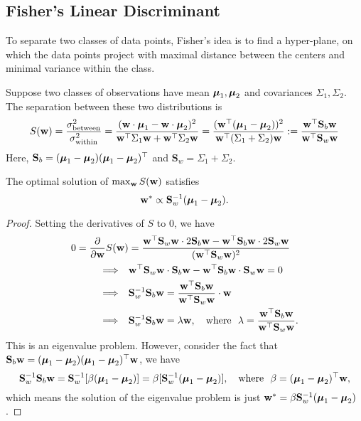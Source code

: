 \subsection{Fisher's Linear Discriminant}
To separate two classes of data points, Fisher's idea is to find a hyper-plane, on which the data points project with  maximal distance between the centers and minimal variance within the class.
\begin{definition}[Separation]
	Suppose two classes of observations have mean $\boldsymbol{\mu}_1, \boldsymbol{\mu}_2$ and covariances $\Sigma_1, \Sigma_2$. The separation between these two distributions is
	$$
	S(\mathbf{w}) =\frac {\sigma_{\text{between}}^{2}}{\sigma _{\text{within}}^{2}}={\frac {({ {\mathbf{w}}}\cdot { {\boldsymbol{\mu}}}_{1}-{ {\mathbf{w}}}\cdot { {\boldsymbol{\mu}}}_{2})^{2}}{{ {\mathbf{w}}}^\top\Sigma _{1}{ {\mathbf{w}}}+{ {\mathbf{w}}}^\top\Sigma _{2}{ {\mathbf{w}}}}}={\frac {({ {\mathbf{w}}}^\top ({ {\boldsymbol{\mu} }}_{1}-{ {\boldsymbol{\mu} }}_{2}))^{2}}{{ {\mathbf{w}}}^\top(\Sigma _{1}+\Sigma _{2}){ {\mathbf{w}}}}} := \frac{\mathbf{w}^\top \mathbf{S}_b \mathbf{w}}{\mathbf{w}^\top \mathbf{S}_w \mathbf{w}}
	$$
	Here, $\mathbf{S}_b = (\boldsymbol{\mu}_1-\boldsymbol{\mu}_2) (\boldsymbol{\mu}_1-\boldsymbol{\mu}_2)^\top $ and $\mathbf{S}_w = \Sigma _{1}+\Sigma _{2}$.
\end{definition}
\begin{theorem}[Solution]
	The optimal solution of $\max_{\mathbf{w}} S(\mathbf{w})$ satisfies
	$$
	\mathbf{w}^* \propto \mathbf{S}_{w}^{-1}(\boldsymbol{\mu}_1 - \boldsymbol{\mu}_2).
	$$
\end{theorem}
\begin{proof}
	Setting the derivatives of $S$ to $0$, we have
	\begin{align}
		0 = \frac{\partial}{\partial \mathbf{w}}S(\mathbf{w}) & = \frac{\mathbf{w}^\top \mathbf{S}_w \mathbf{w} \cdot 2\mathbf{S}_b \mathbf{w} - \mathbf{w}^\top \mathbf{S}_b \mathbf{w} \cdot 2\mathbf{S}_w \mathbf{w}}{(\mathbf{w}^\top \mathbf{S}_w \mathbf{w})^2}  \\
		\Longrightarrow \quad &  \mathbf{w}^\top \mathbf{S}_w \mathbf{w} \cdot \mathbf{S}_b \mathbf{w} - \mathbf{w}^\top \mathbf{S}_b \mathbf{w} \cdot \mathbf{S}_w \mathbf{w} = 0 \\
		\Longrightarrow \quad &   \mathbf{S}_w^{-1} \mathbf{S}_b \mathbf{w} =\frac{ \mathbf{w}^\top \mathbf{S}_b \mathbf{w}}{\mathbf{w}^\top \mathbf{S}_w \mathbf{w}} \cdot  \mathbf{w} \\		
		\Longrightarrow \quad &   \mathbf{S}_w^{-1} \mathbf{S}_b \mathbf{w} = \lambda  \mathbf{w}, \quad \text{where}\ \  \lambda = \frac{ \mathbf{w}^\top \mathbf{S}_b \mathbf{w}}{\mathbf{w}^\top \mathbf{S}_w \mathbf{w}}. \\	
	\end{align}
	This is an eigenvalue problem. However, consider the fact that $\mathbf{S}_b \mathbf{w} = (\boldsymbol{\mu}_1-\boldsymbol{\mu}_2) (\boldsymbol{\mu}_1-\boldsymbol{\mu}_2)^\top \mathbf{w} $, we have
	\begin{equation}
		\mathbf{S}_w^{-1} \mathbf{S}_b \mathbf{w} = \mathbf{S}_w^{-1} [\beta (\boldsymbol{\mu}_1-\boldsymbol{\mu}_2)] = \beta [\mathbf{S}_w^{-1} (\boldsymbol{\mu}_1-\boldsymbol{\mu}_2)], \quad \text{where}\ \  \beta = (\boldsymbol{\mu}_1-\boldsymbol{\mu}_2)^\top \mathbf{w},
	\end{equation}
	which means the solution of the eigenvalue problem is just $\mathbf{w}^* = \beta \mathbf{S}_w^{-1} (\boldsymbol{\mu}_1-\boldsymbol{\mu}_2)$.
\end{proof}
